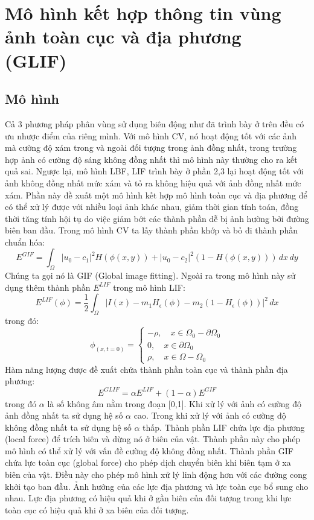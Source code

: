 \documentclass[12pt, oneside, a4paper]{book}
\begin{document}
\section{Mô hình kết hợp thông tin vùng ảnh toàn cục và địa phương (GLIF)}
\subsection{Mô hình}
Cả 3 phương pháp phân vùng sử dụng biên động như đã trình bày ở trên đều có ưu nhược điểm của riêng mình. Với mô hình CV, nó hoạt động tốt với các ảnh mà cường độ xám trong và ngoài đối tượng trong ảnh đồng nhất, trong trường hợp  ảnh có cường độ sáng không đồng nhất thì mô hình này thường cho ra kết quả sai. Ngược lại, mô hình LBF, LIF trình bày ở phần 2,3 lại hoạt động tốt với ảnh không đồng nhất mức xám và tỏ ra không hiệu quả với ảnh đồng nhất mức xám. Phần này  đề xuất một mô hình kết hợp mô hình toàn cục và địa phương để có thể xử lý được với nhiều loại ảnh khác nhau, giảm thời gian tính toán, đồng thời tăng tính hội tụ do việc giảm bớt các thành phần dễ bị ảnh hường bởi đường biên ban đầu. Trong mô hình CV ta lấy thành phần khớp và bỏ đi thành phần chuẩn hóa:
\begin{equation*}
E^{GIF}=\int_{\Omega} |u_0-c_1|^2H(\phi(x,y))+ |u_0-c_2|^2(1-H(\phi(x,y))) \,dx\,dy
\end{equation*} 
Chúng ta gọi nó là GIF (Global image fitting). Ngoài ra trong mô hình này sử dụng thêm thành phần $E^{LIF}$ trong mô hình LIF:
\begin{equation*}
E^{LIF}(\phi)=\dfrac{1}{2}\int_{\Omega}|I(x)-m_1H_{\epsilon}\left(\phi\right)-m_2\left(1-H_{\epsilon}(\phi)\right)|^2\,dx
\end{equation*}
trong đó:
\begin{equation*}
\phi_(x,t=0)=\begin{cases}
-\rho,\quad x\in \Omega_0 -\partial \Omega_0\\
0,\quad x\in \partial \Omega_0\\
\rho,\quad x\in \Omega- \Omega_0
\end{cases}
\end{equation*}
Hàm năng lượng được đề xuất chứa thành phần toàn cục và thành phần địa phương:
\begin{equation}
E^{GLIF}=\alpha E^{LIF}+(1-\alpha)E^{GIF}
\end{equation}
trong đó $\alpha$ là số không âm nằm trong đoạn [0,1]. Khi xử lý với ảnh có cường độ ảnh đồng nhất ta sử dụng hệ số $\alpha$ cao. Trong khi xử lý với ảnh có cường độ không đồng nhất ta sử dụng hệ số $\alpha$ thấp. Thành phần LIF chứa lực địa phương (local force) để trích biên và dừng nó ở biên của vật. Thành phần này cho phép mô hình có thể xử lý với vấn đề cường độ không đồng nhất. Thành phần GIF chứa lực toàn cục (global force) cho phép dịch chuyển biên khi biên tạm ở xa biên của vật. Điều này cho phép mô hình xử lý linh động hơn với các đường cong khởi tạo ban đầu.
Ảnh hưởng của các lực địa phương và lực toàn cục bổ sung cho nhau. Lực địa phương có hiệu quả khi ở gần biên của đối tượng trong khi lực toàn cục có hiệu quả khi ở xa biên của đối tượng. 
\end{document}
